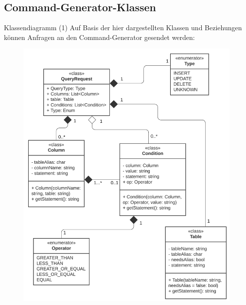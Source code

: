\documentclass[toc]{beamer}
\begin{document}
        \subsection{Command-Generator-Klassen}
        \begin{frame}{Klassendiagramm (1)}
        Auf Basis der hier dargestellten Klassen und Beziehungen können Anfragen an den Command-Generator gesendet werden:
        
            \begin{figure}[htp]
                   \includegraphics[scale=0.695]{UML-Klasse.png}
                    
                    \end{figure}
        \end{frame}
        
\end{document}

